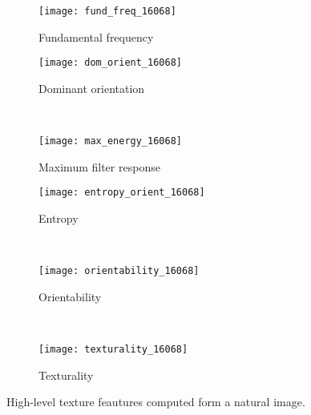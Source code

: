 \begin{figure}[!ht] 
	\centering   
    \begin{subfigure}[b]{0.49\textwidth}
    	\texttt{[image: fund\_freq\_16068]}
        \caption{Fundamental frequency}
        \label{fig:fund_freq_16068}
    \end{subfigure}
    \begin{subfigure}[b]{0.49\textwidth}
    	\texttt{[image: dom\_orient\_16068]}
        \caption{Dominant orientation}
        \label{fig:dom_orient_16068}
    \end{subfigure}\\
    \begin{subfigure}[b]{0.49\textwidth}
    	\texttt{[image: max\_energy\_16068]}
        \caption{Maximum filter response}
        \label{fig:max_energy_16068}
    \end{subfigure}
    \begin{subfigure}[b]{0.49\textwidth}
    	\texttt{[image: entropy\_orient\_16068]}
        \caption{Entropy}
        \label{fig:entropy_orient_16068}
    \end{subfigure}\\
    \begin{subfigure}[b]{0.8\textwidth}
    	\texttt{[image: orientability\_16068]}
        \caption{Orientability}
        \label{fig:orientability_16068}
    \end{subfigure}\\
    \begin{subfigure}[b]{0.8\textwidth}
    	\texttt{[image: texturality\_16068]}
        \caption{Texturality}
        \label{fig:texturality_16068}
    \end{subfigure}    
                  
    \caption{High-level texture feautures computed form a natural image.}\label{fig:high_level_features_zebre}    
\end{figure}


